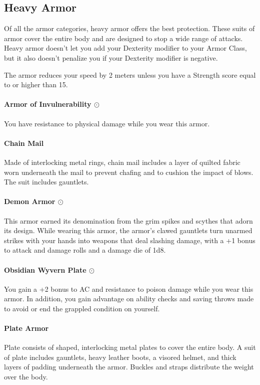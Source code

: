\subsection*{Heavy Armor} \label{ssec::heavyarmor}
    Of all the armor categories, heavy armor offers the best protection.
    These suits of armor cover the entire body and are designed to stop a wide range of attacks.
    Heavy armor doesn't let you add your Dexterity modifier to your Armor Class, but it also doesn't penalize you if your Dexterity modifier is negative.

    The armor reduces your speed by 2 meters unless you have a Strength score equal to or higher than 15.

    \paragraph{Armor of Invulnerability $\odot$}
        You have resistance to physical damage while you wear this armor.
    \paragraph{Chain Mail}
        Made of interlocking metal rings, chain mail includes a layer of quilted fabric worn underneath the mail to prevent chafing and to cushion the impact of blows.
        The suit includes gauntlets.
    \paragraph{Demon Armor $\odot$}
        This armor earned its denomination from the grim spikes and scythes that adorn its design.
        While wearing this armor, the armor's clawed gauntlets turn unarmed strikes with your hands into weapons that deal slashing damage, with a +1 bonus to attack and damage rolls and a damage die of 1d8.
    \paragraph{Obsidian Wyvern Plate $\odot$}
        You gain a +2 bonus to AC and resistance to poison damage while you wear this armor.
        In addition, you gain advantage on ability checks and saving throws made to avoid or end the grappled condition on yourself.
    \paragraph{Plate Armor}
        Plate consists of shaped, interlocking metal plates to cover the entire body.
        A suit of plate includes gauntlets, heavy leather boots, a visored helmet, and thick layers of padding underneath the armor.
        Buckles and straps distribute the weight over the body.
